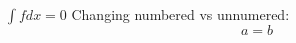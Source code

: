 \documentclass[12pt]{article}
\begin{document}
\begin{math}
  \int f dx =0
\end{math}
Changing numbered vs unnumered:
    \begin{equation}
        a = b
    \end{equation}
\end{document}
